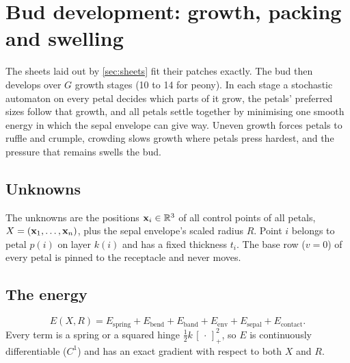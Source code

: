 \section{Bud development: growth, packing and swelling}\label{sec:packing}

The sheets laid out by \cref{sec:sheets} fit their patches exactly. The bud
then develops over $G$ growth stages (10 to 14 for peony). In each stage a
stochastic automaton on every petal decides which parts of it grow, the
petals' preferred sizes follow that growth, and all petals settle together by
minimising one smooth energy in which the sepal envelope can give way. Uneven
growth forces petals to ruffle and crumple, crowding slows growth where petals
press hardest, and the pressure that remains swells the bud.

\subsection{Unknowns}
The unknowns are the positions $\mathbf{x}_i\in\mathbb{R}^3$ of all control points of all
petals, $X = (\mathbf{x}_1,\dots,\mathbf{x}_n)$, plus the sepal envelope's scaled radius $R$.
Point $i$ belongs to petal $p(i)$ on layer $k(i)$ and has a fixed thickness
$t_i$. The base row ($v=0$) of every petal is pinned to the receptacle and
never moves.

\subsection{The energy}
\[
  E(X, R) = E_{\mathrm{spring}} + E_{\mathrm{bend}} + E_{\mathrm{band}} + E_{\mathrm{env}} + E_{\mathrm{sepal}} + E_{\mathrm{contact}}.
\]
Every term is a spring or a squared hinge $\tfrac12 k\,[\,\cdot\,]_+^2$, so $E$ is
continuously differentiable ($C^1$) and has an exact gradient with respect to
both $X$ and $R$.

